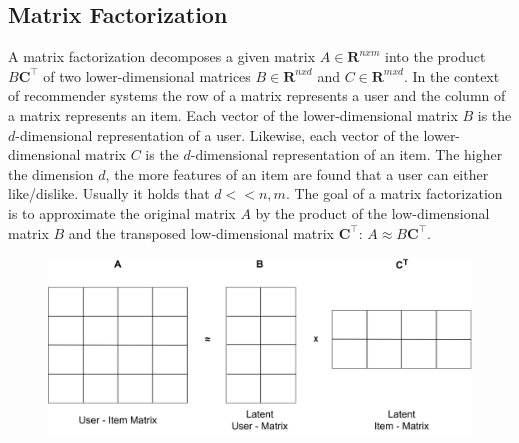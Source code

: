 \subsection{Matrix Factorization}
A matrix factorization decomposes a given matrix \boldmath${A} \in \mathbf{R}^{nxm}$ into the product \boldmath${B} \mathbf{C}^\top$ of two lower-dimensional matrices $B \in \mathbf{R}^{nxd}$ and $C \in \mathbf{R}^{mxd}$.
In the context of recommender systems the row of a matrix represents a user and the column of a matrix represents an item.
Each vector of the lower-dimensional matrix $B$ is the $d$-dimensional representation of a user. Likewise, each vector of the lower-dimensional matrix $C$
is the $d$-dimensional representation of an item.
The higher the dimension $d$, the more features of an item are found that a user can either like/dislike. 
Usually it holds that \boldmath$d << n,m$.
The goal of a matrix factorization is to approximate the original matrix $A$ by the product of the low-dimensional matrix \boldmath${B}$ and the
transposed low-dimensional matrix \boldmath$\mathbf{C}^\top$: \boldmath${A} \approx {B}\mathbf{C}^\top$.

\begin{figure}
    \includegraphics[width=\linewidth]{../images/matrix_factorization.jpg}
    \caption{}
    \label{Fig. 1.1: Matrix Factorization schema with embedding dimension d=2}
  \end{figure}
